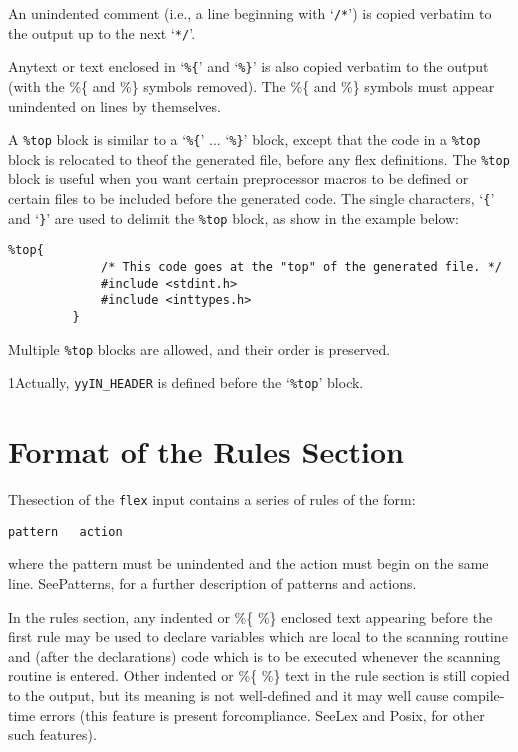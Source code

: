 \documentclass[openany,oneside]{book}
\begin{document}
An unindented comment (i.e., a line
beginning with ‘\verb`/*`’) is copied verbatim to the output up
to the next ‘\verb`*/`’.

Anytext or text enclosed in ‘\verb`%{`’ and ‘\verb`%}`’
is also copied verbatim to the output (with the \%{}\{{} and \%{}\}{} symbols
removed).  The \%{}\{{} and \%{}\}{} symbols must appear unindented on lines by
themselves.

A \verb`%top` block is similar to a ‘\verb`%{`’ ... ‘\verb`%}`’ block, except
that the code in a \verb`%top` block is relocated to theof the
generated file, before any flex definitions. 
The \verb`%top` block is useful when you want certain preprocessor macros to be
defined or certain files to be included before the generated code. 
The single characters, ‘\verb`{`’  and ‘\verb`}`’ are used to delimit the \verb`%top` block, as show in the example below:
\begin{verbatim}
%top{
             /* This code goes at the "top" of the generated file. */
             #include <stdint.h>
             #include <inttypes.h>
         }
\end{verbatim}


Multiple \verb`%top` blocks are allowed, and their order is preserved.

1Actually, \verb`yyIN_HEADER` is defined before the ‘\verb`%top`’ block.
\section{Format of the Rules Section}


Thesection of the \verb`flex` input contains a series of
rules of the form:
\begin{verbatim}
pattern   action
\end{verbatim}


where the pattern must be unindented and the action must begin
on the same line. 
SeePatterns, for a further description of patterns and actions.

In the rules section, any indented or \%{}\{{} \%{}\}{} enclosed text appearing
before the first rule may be used to declare variables which are local
to the scanning routine and (after the declarations) code which is to be
executed whenever the scanning routine is entered.  Other indented or
\%{}\{{} \%{}\}{} text in the rule section is still copied to the output, but its
meaning is not well-defined and it may well cause compile-time errors
(this feature is present forcompliance. SeeLex and Posix, for other such features).
\end{document}
